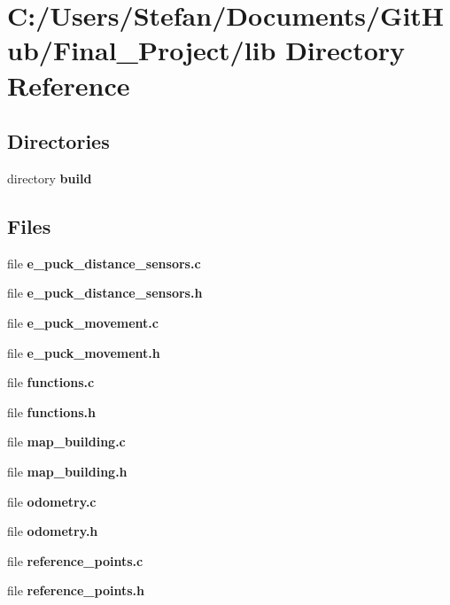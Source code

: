 \section{C\-:/\-Users/\-Stefan/\-Documents/\-Git\-Hub/\-Final\-\_\-\-Project/lib Directory Reference}
\label{dir_783716f39f3be2b206cf8f00b0340903}
\subsection*{Directories}
\begin{DoxyCompactItemize}
\item 
directory {\bf build}
\end{DoxyCompactItemize}
\subsection*{Files}
\begin{DoxyCompactItemize}
\item 
file {\bf e\-\_\-puck\-\_\-distance\-\_\-sensors.\-c}
\item 
file {\bf e\-\_\-puck\-\_\-distance\-\_\-sensors.\-h}
\item 
file {\bf e\-\_\-puck\-\_\-movement.\-c}
\item 
file {\bf e\-\_\-puck\-\_\-movement.\-h}
\item 
file {\bf functions.\-c}
\item 
file {\bf functions.\-h}
\item 
file {\bf map\-\_\-building.\-c}
\item 
file {\bf map\-\_\-building.\-h}
\item 
file {\bf odometry.\-c}
\item 
file {\bf odometry.\-h}
\item 
file {\bf reference\-\_\-points.\-c}
\item 
file {\bf reference\-\_\-points.\-h}
\end{DoxyCompactItemize}
